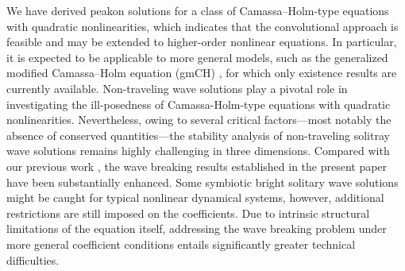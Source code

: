 \documentclass[11pt]{article}
\begin{document}
We have derived peakon solutions for a class of Camassa--Holm-type equations with quadratic nonlinearities, which indicates that the convolutional approach is feasible and may be extended to higher-order nonlinear equations. In particular, it is expected to be applicable to more general models, such as the generalized modified Camassa--Holm equation (gmCH) \cite{gao2021global}, for which only existence results are currently available. Non-traveling
wave solutions play a pivotal role in investigating the ill-posedness of Camassa-Holm-type equations with quadratic nonlinearities. Nevertheless, owing to several critical factors—most notably the absence of conserved quantities—the stability analysis \cite{gui2025stability} of non-traveling solitray wave solutions remains highly challenging in three dimensions. Compared with our previous work \cite{zhu2023rogue}, the wave breaking results established in the present paper have been substantially enhanced. 
Some symbiotic bright solitary wave solutions \cite{lin2006symbiotic} might be caught for typical nonlinear dynamical systems, however, additional restrictions are still imposed on the coefficients. Due to intrinsic structural limitations of the equation itself, addressing the wave breaking problem under more general coefficient conditions entails significantly greater technical difficulties. 
\end{document}
